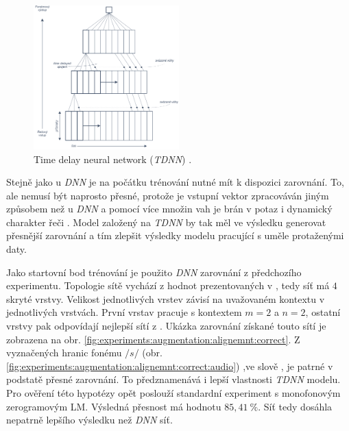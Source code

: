 \begin{figure}[hbpt]
  \centering
  \includegraphics[width=0.5\textwidth]{./ch5-construction/img/tdnn.pdf}
  \caption{Time delay neural network (\textit{TDNN}) .}
  \label{fig:experiments:augmentation:tdnn}
\end{figure}

Stejně jako u \textit{DNN} je na počátku trénování nutné mít k dispozici zarovnání. To, ale nemusí být naprosto přesné, protože je vstupní vektor zpracováván jiným způsobem než u \textit{DNN} a pomocí více množin vah je brán v potaz i dynamický charakter řeči \cite{Peddinti2015}. Model založený na \textit{TDNN} by tak měl ve výsledku generovat přesnější zarovnání a tím zlepšit výsledky modelu pracující s uměle protaženými daty.

Jako startovní bod trénování je použito \textit{DNN} zarovnání z předchozího experimentu. Topologie sítě vychází z hodnot prezentovaných v \cite{Peddinti2015}, tedy síť má $4$ skryté vrstvy. Velikost jednotlivých vrstev závisí na uvažovaném kontextu v jednotlivých vrstvách. První vrstav pracuje s kontextem $m=2$ a $n=2$, ostatní vrstvy pak odpovídají nejlepší sítí z \cite{Peddinti2015}. Ukázka zarovnání získané touto sítí je zobrazena na obr. \ref{fig:experiments:augmentation:alignemnt:correct}. Z vyznačených hranic fonému $/s/$ (obr. \ref{fig:experiments:augmentation:alignemnt:correct:audio}) ,ve slově , je patrné v podstatě přesné zarovnání. To předznamenává i lepší vlastnosti \textit{TDNN} modelu. Pro ověření této hypotézy opět poslouží standardní experiment s monofonovým zerogramovým LM. Výsledná přesnost má hodnotu $85,41\ \%$. Síť tedy dosáhla nepatrně lepšího výsledku než \textit{DNN} síť.

